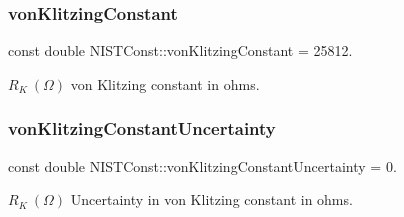 \subsubsection{\texorpdfstring{von\+Klitzing\+Constant}{vonKlitzingConstant}}
{\footnotesize\ttfamily const double N\+I\+S\+T\+Const\+::von\+Klitzing\+Constant = 25812.}

$R_K \ (\Omega)$ von Klitzing constant in ohms. \mbox{\label{group__von_klitzing_constant_ga8fa7b05f4ab4958f9bed81f592304e49}} 
\subsubsection{\texorpdfstring{von\+Klitzing\+Constant\+Uncertainty}{vonKlitzingConstantUncertainty}}
{\footnotesize\ttfamily const double N\+I\+S\+T\+Const\+::von\+Klitzing\+Constant\+Uncertainty = 0.}

$R_K \ (\Omega)$ Uncertainty in von Klitzing constant in ohms. 
